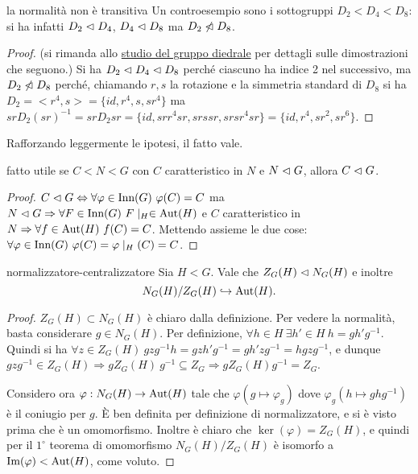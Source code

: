 \begin{proposition}{la normalità non è transitiva}
    Un controesempio sono i sottogruppi $D_2 < D_4 < D_8$: si ha infatti $D_2 \vartriangleleft D_4$, $D_4 \vartriangleleft D_8$ ma $D_2 \not \vartriangleleft D_8$.
\end{proposition}
\begin{proof}
    (si rimanda allo \hyperlink{diedrale}{studio del gruppo diedrale} per dettagli sulle dimostrazioni che seguono.) Si ha $D_2 \vartriangleleft D_4 \vartriangleleft D_8$ perché ciascuno ha indice 2 nel successivo, ma $D_2 \not \vartriangleleft D_8$ perché, chiamando $r,s$ la rotazione e la simmetria standard di $D_8$ si ha $D_2 = <r^4, s> = \{id, r^4, s, sr^4\}$ ma $srD_2(sr)^{-1} = srD_2sr = \{id, srr^4sr, srssr, srsr^4sr\} = \{id, r^4, sr^2, sr^6\}$. 
\end{proof}
Rafforzando leggermente le ipotesi, il fatto vale.
\begin{proposition}{fatto utile}
    se $C < N< G$ con $C$ caratteristico in $N$ e $N \vartriangleleft G$, allora $C \vartriangleleft G$.
\end{proposition}
\begin{proof}
    $C \vartriangleleft G \Leftrightarrow \forall \varphi \in \text{Inn}(G) \ \varphi(C) = C$ ma $N \tri G \Rightarrow \forall F \in \Inn(G) \ F\mid_H \in \Aut(H)$ e $C$ caratteristico in $N \Rightarrow \forall f \in \text{Aut}(H) \ f(C)= C$. Mettendo assieme le due cose: $ \forall \varphi \in \text{Inn}(G) \ \varphi(C)  = \varphi\mid_H(C) = C$. 
\end{proof}
\begin{lemma}{normalizzatore-centralizzatore}
    Sia $H < G$.  Vale che $Z_G(H) \vartriangleleft N_G(H)$ e inoltre
    \[
        N_G(H)/Z_G(H) \hookrightarrow \text{Aut}(H).
    \]
\end{lemma}
\begin{proof}
    $Z_G(H) \subset N_G(H)$ è chiaro dalla definizione. Per vedere la normalità, basta considerare $g \in N_G(H)$. Per definizione, $\forall h \in H \ \exists h' \in H \ h = gh'g^{-1}$.
    Quindi si ha $\forall z \in Z_G(H) \ gzg^{-1}h = gzh'g^{-1} = gh'zg^{-1} = hgzg^{-1}$,
    e dunque $gzg^{-1} \in Z_G(H) \Rightarrow gZ_G(H) \ g^{-1} \subseteq Z_G  \Rightarrow gZ_G(H)g^{-1} = Z_G$.
    
    Considero ora $\varphi: N_G(H) \rightarrow \text{Aut}(H)$ tale che $\varphi(g \mapsto \varphi_g)$ dove $\varphi_g(h \mapsto ghg^{-1})$ è il coniugio per $g$. È ben definita per definizione di normalizzatore, e si è visto prima che è un omomorfismo. Inoltre è chiaro che $\ker(\varphi) = Z_G(H)$, e quindi per il $1^{\circ}$ teorema di omomorfismo $N_G(H)/Z_G(H)$ è isomorfo a $\text{Im}(\varphi) < \text{Aut}(H)$, come voluto. 
\end{proof}

